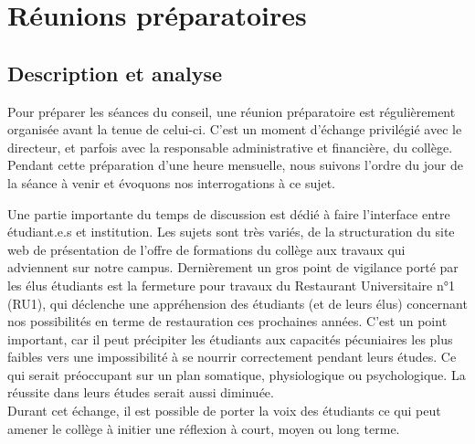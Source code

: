 \documentclass{article}
\begin{document}
\section{Réunions préparatoires} 

\subsection{Description et analyse}
Pour préparer les séances du conseil, une réunion préparatoire est régulièrement organisée avant la tenue de celui-ci. 
C'est un moment d'échange privilégié avec le directeur, et parfois avec la responsable administrative et financière, du collège. 
Pendant cette préparation d'une heure mensuelle, nous suivons l'ordre du jour de la séance à venir et évoquons nos interrogations à ce sujet. 

Une partie importante du temps de discussion est dédié à faire l'interface entre étudiant.e.s et institution. 
Les sujets sont très variés, de la structuration du site web de présentation de l'offre de formations du collège aux travaux qui adviennent sur notre campus. 
Dernièrement un gros point de vigilance porté par les élus étudiants est la fermeture pour travaux du Restaurant Universitaire n°1 (RU1), qui déclenche une appréhension des étudiants (et de leurs élus) concernant nos possibilités en terme de restauration ces prochaines années. 
C'est un point important, car il peut précipiter les étudiants aux capacités pécuniaires les plus faibles vers une impossibilité à se nourrir correctement pendant leurs études. 
Ce qui serait préoccupant sur un plan somatique, physiologique ou psychologique. 
La réussite dans leurs études serait aussi diminuée. \\ 
Durant cet échange, il est possible de porter la voix des étudiants ce qui peut amener le collège à initier une réflexion à court, moyen ou long terme.
\end{document}
